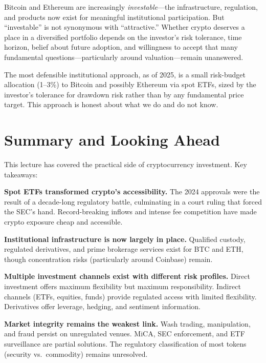 \documentclass[11pt,a4paper]{article}
\begin{document}
Bitcoin and Ethereum are increasingly \textit{investable}---the infrastructure, regulation, and products now exist for meaningful institutional participation. But ``investable'' is not synonymous with ``attractive.'' Whether crypto deserves a place in a diversified portfolio depends on the investor's risk tolerance, time horizon, belief about future adoption, and willingness to accept that many fundamental questions---particularly around valuation---remain unanswered.

The most defensible institutional approach, as of 2025, is a small risk-budget allocation (1--3\%) to Bitcoin and possibly Ethereum via spot ETFs, sized by the investor's tolerance for drawdown risk rather than by any fundamental price target. This approach is honest about what we do and do not know.

\section{Summary and Looking Ahead}

This lecture has covered the practical side of cryptocurrency investment. Key takeaways:

\textbf{Spot ETFs transformed crypto's accessibility.} The 2024 approvals were the result of a decade-long regulatory battle, culminating in a court ruling that forced the SEC's hand. Record-breaking inflows and intense fee competition have made crypto exposure cheap and accessible.

\textbf{Institutional infrastructure is now largely in place.} Qualified custody, regulated derivatives, and prime brokerage services exist for BTC and ETH, though concentration risks (particularly around Coinbase) remain.

\textbf{Multiple investment channels exist with different risk profiles.} Direct investment offers maximum flexibility but maximum responsibility. Indirect channels (ETFs, equities, funds) provide regulated access with limited flexibility. Derivatives offer leverage, hedging, and sentiment information.

\textbf{Market integrity remains the weakest link.} Wash trading, manipulation, and fraud persist on unregulated venues. MiCA, SEC enforcement, and ETF surveillance are partial solutions. The regulatory classification of most tokens (security vs.\ commodity) remains unresolved.
\end{document}
